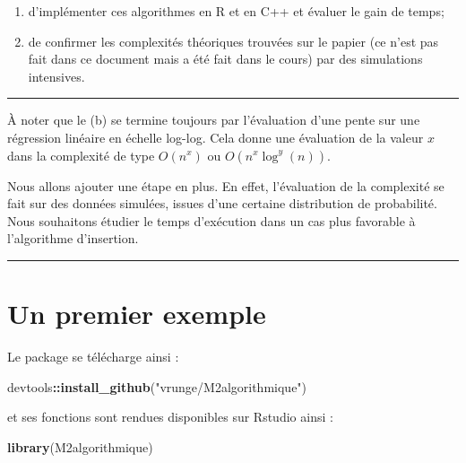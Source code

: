 \documentclass[
]{article}
\newenvironment{Shaded}{\begin{snugshade}}{\end{snugshade}}
\newcommand{\FunctionTok}[1]{\textcolor[rgb]{0.13,0.29,0.53}{\textbf{#1}}}
\newcommand{\NormalTok}[1]{#1}
\newcommand{\SpecialCharTok}[1]{\textcolor[rgb]{0.81,0.36,0.00}{\textbf{#1}}}
\newcommand{\StringTok}[1]{\textcolor[rgb]{0.31,0.60,0.02}{#1}}
\begin{document}
\begin{enumerate}
\def\labelenumi{\alph{enumi})}
\item
  d'implémenter ces algorithmes en R et en C++ et évaluer le gain de
  temps;
\item
  de confirmer les complexités théoriques trouvées sur le papier (ce
  n'est pas fait dans ce document mais a été fait dans le cours) par des
  simulations intensives.
\end{enumerate}

\begin{center}\rule{0.5\linewidth}{0.5pt}\end{center}

À noter que le (b) se termine toujours par l'évaluation d'une pente sur
une régression linéaire en échelle log-log. Cela donne une évaluation de
la valeur \(x\) dans la complexité de type \(O(n^x)\) ou
\(O(n^x \log^y(n))\).

Nous allons ajouter une étape en plus. En effet, l'évaluation de la
complexité se fait sur des données simulées, issues d'une certaine
distribution de probabilité. Nous souhaitons étudier le temps
d'exécution dans un cas plus favorable à l'algorithme d'insertion.

\begin{center}\rule{0.5\linewidth}{0.5pt}\end{center}

\section{Un premier exemple}\label{un-premier-exemple}

Le package se télécharge ainsi :

\begin{Shaded}
\begin{Highlighting}[]
\NormalTok{devtools}\SpecialCharTok{::}\FunctionTok{install\_github}\NormalTok{(}\StringTok{"vrunge/M2algorithmique"}\NormalTok{)}
\end{Highlighting}
\end{Shaded}

et ses fonctions sont rendues disponibles sur Rstudio ainsi :

\begin{Shaded}
\begin{Highlighting}[]
\FunctionTok{library}\NormalTok{(M2algorithmique)}
\end{Highlighting}
\end{Shaded}
\end{document}
